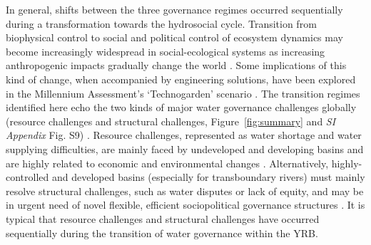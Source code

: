 In general, shifts between the three governance regimes occurred sequentially during a transformation towards the hydrosocial cycle.
Transition from biophysical control to social and political control of ecosystem dynamics may become increasingly widespread in social-ecological systems as increasing anthropogenic impacts gradually change the world
\cite{bestPaceHumanInducedChange2020,cummingLinkingeconomicgrowth2018,cummingImplicationsagriculturaltransitions2014}.
Some implications of this kind of change, when accompanied by engineering solutions, have been explored in the Millennium Assessment’s `Technogarden' scenario %
\cite{millenniumecosystemassessmentEcosystemshumanwellbeing2005}.
The transition regimes identified here echo the two kinds of major water governance challenges globally (resource challenges and structural challenges, Figure~\ref{fig:summary} and \textit{SI Appendix} Fig. S9)
\cite{singhWaterGovernanceChallenges2019,porcherFacingChallengesWater2019}.
Resource challenges, represented as water shortage and water supplying difficulties, are mainly faced by undeveloped and developing basins and are highly related to economic and environmental changes
\cite{allanNavigatingcomplexitiescoordinated2019,florkeWatercompetitioncities2018,liuWaterSustainabilityChina2012}.
Alternatively, highly-controlled and developed basins (especially for transboundary rivers) must mainly resolve structural challenges, such as water disputes or lack of equity, and may be in urgent need of novel flexible, efficient sociopolitical governance structures %
\cite{kitroeffThisWarCrossBorder2020,kitroeffThisWarCrossBorder2020,roobavannanRoleSectoralTransformation2017,unep-dhiTransboundaryRiverBasins2016}.
It is typical that resource challenges and structural challenges have occurred sequentially during the transition of water governance within the YRB.
